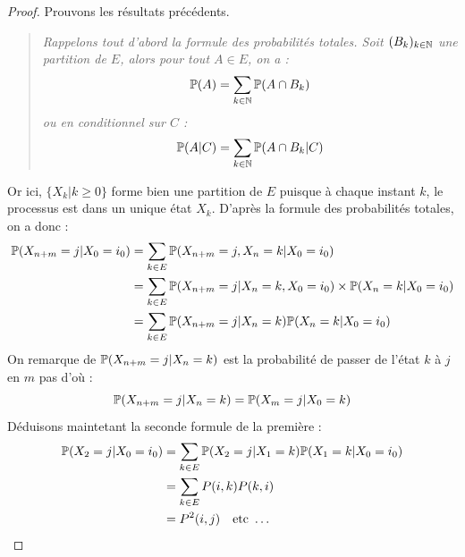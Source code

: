 \begin{proof}
    Prouvons les résultats précédents. 
    \begin{quote}
        \emph{
            Rappelons tout d'abord la formule des probabilités totales. 
            Soit $(B_k)_{k \in  \mathbb{N}}$ une partition de $E$, alors pour tout $A \in E$, on a :
                \[ \mathbb{P}(A) = \sum_{k \in \mathbb{N}} \mathbb{P}(A \cap B_k) \] 
            ou en conditionnel sur $C$ :
                \[ \mathbb{P}(A|C) = \sum_{k \in \mathbb{N}} \mathbb{P}(A \cap B_k | C) \]   
        }
    \end{quote}
    Or ici, $\{X_k | k \geqslant 0\}$ forme bien une partition de $E$ puisque à chaque instant $k$, 
    le processus est dans un unique état $X_k$. D'après la formule des probabilités totales, on a donc :
    \begin{align*}
        \mathbb{P}(X_{n +m} = j | X_0 = i_0) &= \sum_{k \in E} \mathbb{P}(X_{n+m} = j, X_n = k | X_0 = i_0) \\ 
        &= \sum_{k \in E} \mathbb{P}(X_{n+m} = j | X_n = k, X_0 = i_0) \times \mathbb{P}(X_n = k | X_0 = i_0) \\ 
        &=  \sum_{k \in E} \mathbb{P}(X_{n+m} = j | X_n = k) \mathbb{P}(X_n = k | X_0 = i_0)  
    \end{align*}
    On remarque de $\mathbb{P}(X_{n+m} = j | X_n = k)$ est la probabilité de passer de l'état $k$ à $j$ en $m$ pas d'où :
        \[ \mathbb{P}(X_{n+m} = j | X_n = k) = \mathbb{P}(X_m = j | X_0 = k) \]   
    Déduisons maintetant la seconde formule de la première : 
        \begin{align*}
            \mathbb{P}(X_2 = j | X_0 = i_0) &= \sum_{k \in E} \mathbb{P}(X_2 = j | X_1 = k) \mathbb{P}(X_1 = k | X_0 = i_0) \\ 
            &= \sum_{k \in E} P(i,k)P(k,i) \\ 
            &= P^2(i,j) \quad \text{etc } \dots    
        \end{align*}
\end{proof}




